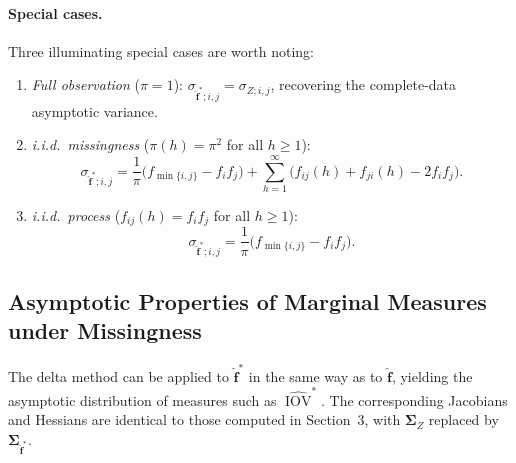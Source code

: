 \documentclass[12pt,a4paper]{scrreprt}
\DeclareMathOperator{\IOV}{IOV}
\begin{document}
\paragraph{Special cases.}
Three illuminating special cases are worth noting:

\begin{enumerate}
    \item \textit{Full observation} ($\pi = 1$): $\sigma_{\hat{\mathbf{f}}^{*};i,j} = \sigma_{Z;i,j}$,
    recovering the complete-data asymptotic variance.

    \item \textit{i.i.d.\ missingness} ($\pi(h) = \pi^2$ for all $h \geq 1$):
    \[
        \sigma_{\hat{\mathbf{f}}^{*};i,j}
        = \frac{1}{\pi}\bigl(f_{\min\{i,j\}} - f_i f_j\bigr)
        + \sum_{h=1}^{\infty}\bigl(f_{ij}(h) + f_{ji}(h) - 2f_i f_j\bigr).
    \]

    \item \textit{i.i.d.\ process} ($f_{ij}(h) = f_i f_j$ for all $h \geq 1$):
    \[
        \sigma_{\hat{\mathbf{f}}^{*};i,j}
        = \frac{1}{\pi}\bigl(f_{\min\{i,j\}} - f_i f_j\bigr).
    \]
\end{enumerate}

\subsection{Asymptotic Properties of Marginal Measures under Missingness}

The delta method can be applied to $\hat{\mathbf{f}}^{*}$ in the same way as to $\hat{\mathbf{f}}$,
yielding the asymptotic distribution of measures such as $\widehat{\IOV}^{*}$. The corresponding
Jacobians and Hessians are identical to those computed in Section~3, with $\boldsymbol{\Sigma}_Z$
replaced by $\boldsymbol{\Sigma}_{\hat{\mathbf{f}}^{*}}$.


\end{document}
